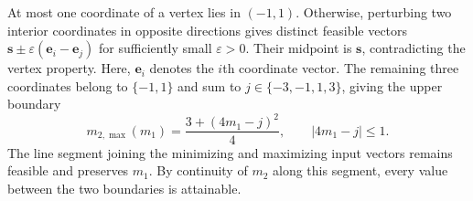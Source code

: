 \documentclass[journal,12pt,onecolumn,draftclsnofoot]{IEEEtran}
\begin{document}
At most one coordinate of a vertex lies in $(-1,1)$.
Otherwise, perturbing two interior coordinates in opposite
directions gives distinct feasible vectors
$\boldsymbol s\pm\varepsilon(\boldsymbol e_i-\boldsymbol e_j)$
for sufficiently small $\varepsilon>0$. Their midpoint is
$\boldsymbol s$, contradicting the vertex property.
Here, $\boldsymbol e_i$ denotes the $i$th coordinate vector.
The remaining three coordinates belong to $\{-1,1\}$ and
sum to $j\in\{-3,-1,1,3\}$, giving the upper boundary
$$
m_{2,\max}(m_1)=\frac{3+(4m_1-j)^2}{4},
\qquad |4m_1-j|\le1.
$$
The line segment joining the minimizing and maximizing input
vectors remains feasible and preserves $m_1$. By continuity
of $m_2$ along this segment, every value between the two
boundaries is attainable.






\end{document}
